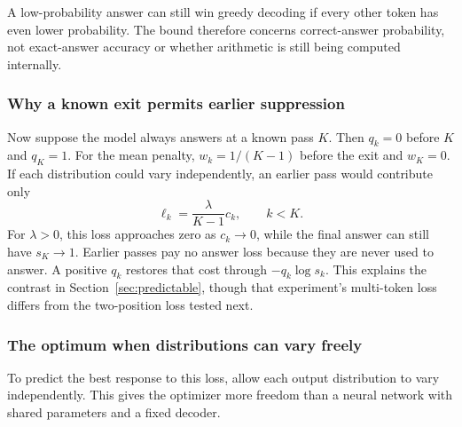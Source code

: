 A low-probability answer can still win greedy decoding if every other token has even lower probability. The bound therefore concerns correct-answer probability, not exact-answer accuracy or whether arithmetic is still being computed internally.

\subsubsection{Why a known exit permits earlier suppression}
Now suppose the model always answers at a known pass $K$. Then $q_k=0$ before $K$ and $q_K=1$. For the mean penalty, $w_k=1/(K-1)$ before the exit and $w_K=0$. If each distribution could vary independently, an earlier pass would contribute only
\begin{equation}
 \ell_k=\frac{\lambda}{K-1}c_k,\qquad k<K.
\end{equation}
For $\lambda>0$, this loss approaches zero as $c_k\to0$, while the final answer can still have $s_K\to1$. Earlier passes pay no answer loss because they are never used to answer. A positive $q_k$ restores that cost through $-q_k\log s_k$. This explains the contrast in Section~\ref{sec:predictable}, though that experiment's multi-token loss differs from the two-position loss tested next.

\subsubsection{The optimum when distributions can vary freely}
To predict the best response to this loss, allow each output distribution to vary independently. This gives the optimizer more freedom than a neural network with shared parameters and a fixed decoder.

